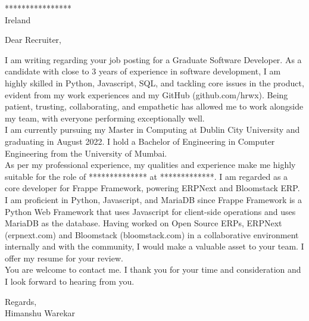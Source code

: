 \documentclass[letterpaper,11pt]{article}
\begin{document}
\vspace{15pt}
\begin{letter} {
**************** \\  
Ireland \\
}
\vspace{15pt}
\opening{Dear Recruiter, \\}
\vspace{15pt}
    \quad \quad I am writing regarding your job posting for a Graduate Software Developer. As a candidate with close to 3 years of experience in software development, I am highly skilled in Python, Javascript, SQL, and tackling core issues in the product, evident from my work experiences and my GitHub (github.com/hrwx). Being patient, trusting, collaborating, and empathetic has allowed me to work alongside my team, with everyone performing exceptionally well.\\
\vspace{5pt}
    \quad \quad I am currently pursuing my Master in Computing at Dublin City University and graduating in August 2022. I hold a Bachelor of Engineering in Computer Engineering from the University of Mumbai.\\
\vspace{5pt} 
    \quad \quad As per my professional experience, my qualities and experience make me highly suitable for the role of ************** at *************. I am regarded as a core developer for Frappe Framework, powering ERPNext and Bloomstack ERP. I am proficient in Python, Javascript, and MariaDB since Frappe Framework is a Python Web Framework that uses Javascript for client-side operations and uses MariaDB as the database. Having worked on Open Source ERPs, ERPNext (erpnext.com) and Bloomstack (bloomstack.com) in a collaborative environment internally and with the community, I would make a valuable asset to your team. I offer my resume for your review.\\
\vspace{5pt}
    \quad \quad You are welcome to contact me. I thank you for your time and consideration and I look forward to hearing from you.\\
\vspace{15pt}

Regards,\\
Himanshu Warekar
\end{letter}
\end{document}
